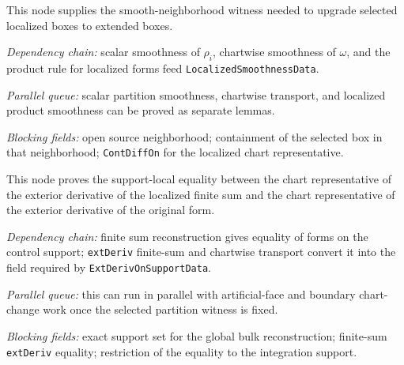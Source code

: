 \begin{lemma}
  \label{obl:m7_localized_smoothness_witnesses}
  This node supplies the smooth-neighborhood witness needed to upgrade selected
  localized boxes to extended boxes.

  \emph{Dependency chain:}
  scalar smoothness of \(\rho_i\), chartwise smoothness of \(\omega\), and the
  product rule for localized forms feed \texttt{LocalizedSmoothnessData}.

  \emph{Parallel queue:}
  scalar partition smoothness, chartwise transport, and localized product
  smoothness can be proved as separate lemmas.

  \emph{Blocking fields:}
  open source neighborhood; containment of the selected box in that
  neighborhood; \texttt{ContDiffOn} for the localized chart representative.
\end{lemma}

\begin{lemma}
  \label{obl:m7_extderiv_on_support}
  This node proves the support-local equality between the chart representative
  of the exterior derivative of the localized finite sum and the chart
  representative of the exterior derivative of the original form.

  \emph{Dependency chain:}
  finite sum reconstruction gives equality of forms on the control support;
  \texttt{extDeriv} finite-sum and chartwise transport convert it into the
  field required by \texttt{ExtDerivOnSupportData}.

  \emph{Parallel queue:}
  this can run in parallel with artificial-face and boundary chart-change work
  once the selected partition witness is fixed.

  \emph{Blocking fields:}
  exact support set for the global bulk reconstruction; finite-sum
  \texttt{extDeriv} equality; restriction of the equality to the integration
  support.
\end{lemma}

